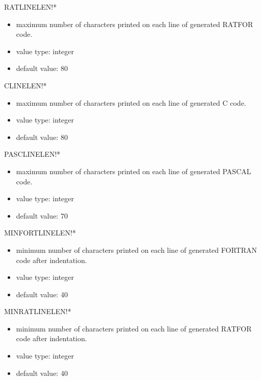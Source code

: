 \begin{describe}{RATLINELEN!*}
\begin{itemize}
\item maximum number of characters printed on each line of generated RATFOR
code.
\item value type:  integer
\item default value:  80
\end{itemize}
\end{describe}

\begin{describe}{CLINELEN!*}
\begin{itemize}
\item maximum number of characters printed on each line of generated C code.
\item value type:  integer
\item default value:  80
\end{itemize}
\end{describe}

\begin{describe}{PASCLINELEN!*}
\begin{itemize}
\item maximum number of characters printed on each line of generated PASCAL
code.
\item value type:  integer
\item default value:  70
\end{itemize}
\end{describe}

\begin{describe}{MINFORTLINELEN!*}
\begin{itemize}
\item minimum number of characters printed on each line of generated FORTRAN
code after indentation.
\item value type:  integer
\item default value:  40
\end{itemize}
\end{describe}

\begin{describe}{MINRATLINELEN!*}
\begin{itemize}
\item minimum number of characters printed on each line of generated RATFOR
code after indentation.
\item value type:  integer
\item default value:  40
\end{itemize}
\end{describe}

